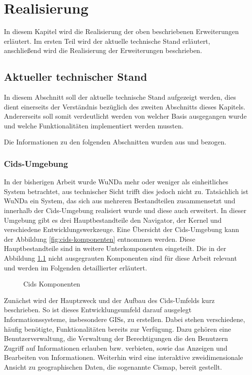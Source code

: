 \chapter{Realisierung} \label{ch:realisierung}

In diesem Kapitel wird die Realisierung der oben beschriebenen Erweiterungen erläutert.
Im ersten Teil wird der aktuelle technische Stand erläutert, anschließend wird die Realisierung der Erweiterungen beschrieben. 

\section{Aktueller technischer Stand}

In diesem Abschnitt soll der aktuelle technische Stand aufgezeigt werden, dies dient einerseits der Verständnis bezüglich des zweiten Abschnitts dieses Kapitels.
Andererseits soll somit verdeutlicht werden von welcher Basis ausgegangen wurde und welche Funktionalitäten implementiert werden mussten.

Die Informationen zu den folgenden Abschnitten wurden aus \autocite{cismet-cids} und \autocite{cismet-readme} bezogen.

\subsection{Cids-Umgebung}
In der bisherigen Arbeit wurde \ac{WuNDa} mehr oder weniger als einheitliches System betrachtet, aus technischer Sicht trifft dies jedoch nicht zu. Tatsächlich ist \ac{WuNDa} ein System, das sich aus mehreren Bestandteilen zusammensetzt und innerhalb der Cids-Umgebung realisiert wurde und diese auch erweitert. In dieser Umgebung gibt es drei Hauptbestandteile den Navigator, der Kernel und verschiedene Entwicklungswerkzeuge.
Eine Übersicht der Cids-Umgebung kann der Abbildung \vref{fig:cids-komponenten} entnommen werden. Diese Hauptbestandteile sind in weitere Unterkomponenten eingeteilt. Die in der Abbildung \ref{fig:cids-komponenten} nicht ausgegrauten Komponenten sind für diese Arbeit relevant und werden im Folgenden detaillierter erläutert.

\begin{figure}[htb]
	\centering
	\caption{Cids Komponenten}
	\label{fig:cids-komponenten}
\end{figure}

Zunächst wird der Hauptzweck und der Aufbau des Cids-Umfelds kurz beschrieben. So ist dieses Entwicklungsumfeld darauf ausgelegt Informationssysteme, insbesondere \acp{GIS}, zu erstellen.
Dabei stehen verschiedene, häufig benötigte, Funktionalitäten bereits zur Verfügung. Dazu gehören eine Benutzerverwaltung, die Verwaltung der Berechtigungen die den Benutzern Zugriff auf Informationen erlauben bzw. verbieten, sowie das Anzeigen und Bearbeiten von Informationen. Weiterhin wird eine interaktive zweidimensionale Ansicht zu geographischen Daten, die sogenannte Cismap, bereit gestellt.

